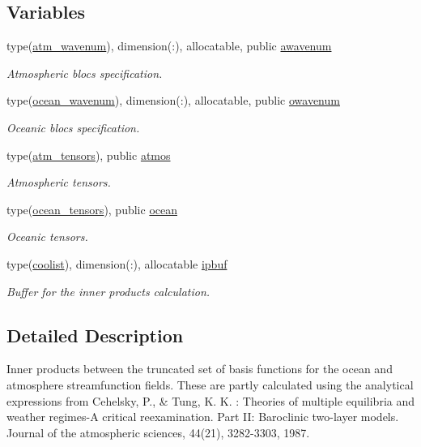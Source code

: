 \subsection*{Variables}
\begin{DoxyCompactItemize}
\item 
type(\hyperlink{structinprod__analytic_1_1atm__wavenum}{atm\+\_\+wavenum}), dimension(\+:), allocatable, public \hyperlink{namespaceinprod__analytic_aa6b6ebedac44495720ffe649bc937a56}{awavenum}
\begin{DoxyCompactList}\small\item\em Atmospheric blocs specification. \end{DoxyCompactList}\item 
type(\hyperlink{structinprod__analytic_1_1ocean__wavenum}{ocean\+\_\+wavenum}), dimension(\+:), allocatable, public \hyperlink{namespaceinprod__analytic_a7273713c6b1a079e1c653e8b8d2fe089}{owavenum}
\begin{DoxyCompactList}\small\item\em Oceanic blocs specification. \end{DoxyCompactList}\item 
type(\hyperlink{structinprod__analytic_1_1atm__tensors}{atm\+\_\+tensors}), public \hyperlink{namespaceinprod__analytic_a6f4fe9aa292d78b871e5498e411d1297}{atmos}
\begin{DoxyCompactList}\small\item\em Atmospheric tensors. \end{DoxyCompactList}\item 
type(\hyperlink{structinprod__analytic_1_1ocean__tensors}{ocean\+\_\+tensors}), public \hyperlink{namespaceinprod__analytic_ac691a1258fb0a341e2ba5b4811be1c0b}{ocean}
\begin{DoxyCompactList}\small\item\em Oceanic tensors. \end{DoxyCompactList}\item 
type(\hyperlink{structtensor_1_1coolist}{coolist}), dimension(\+:), allocatable \hyperlink{namespaceinprod__analytic_a6263b2bbddcdb63f1629be2c7ba9021d}{ipbuf}
\begin{DoxyCompactList}\small\item\em Buffer for the inner products calculation. \end{DoxyCompactList}\end{DoxyCompactItemize}


\subsection{Detailed Description}
Inner products between the truncated set of basis functions for the ocean and atmosphere streamfunction fields. These are partly calculated using the analytical expressions from Cehelsky, P., \& Tung, K. K. \+: Theories of multiple equilibria and weather regimes-\/A critical reexamination. Part II\+: Baroclinic two-\/layer models. Journal of the atmospheric sciences, 44(21), 3282-\/3303, 1987. 

